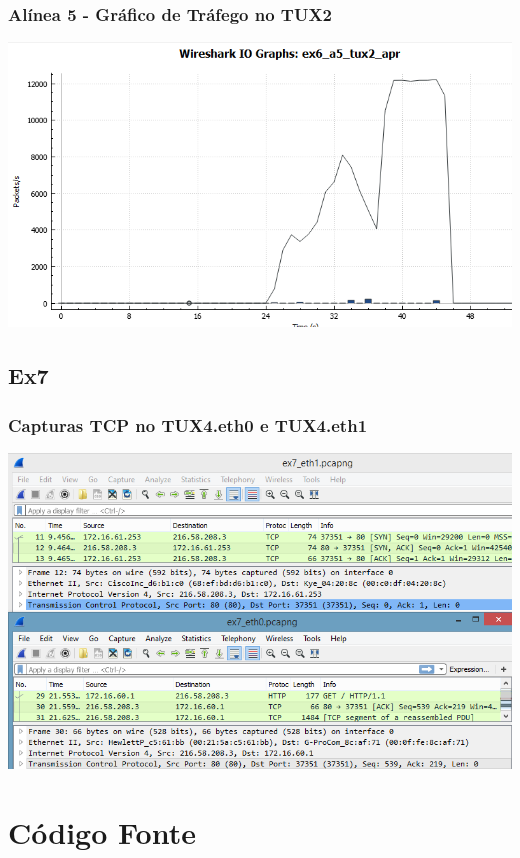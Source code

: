 \documentclass[11pt,a4paper,reqno]{report}
\numberwithin{equation}{section}
\begin{document}
\begin{appendices}
\subsection{Alínea 5 - Gráfico de Tráfego no TUX2}
\label{ex6_a5_2io}
\includegraphics[width=18cm]{ex6_a5_tux2_IO.png}

\section{Ex7}%

\subsection{Capturas TCP no TUX4.eth0 e TUX4.eth1}
\label{ex7_tcp}
\includegraphics[width=18cm]{ex7_TCP.png}

\chapter{Código Fonte}






\pagebreak


\end{appendices}
\end{document}

